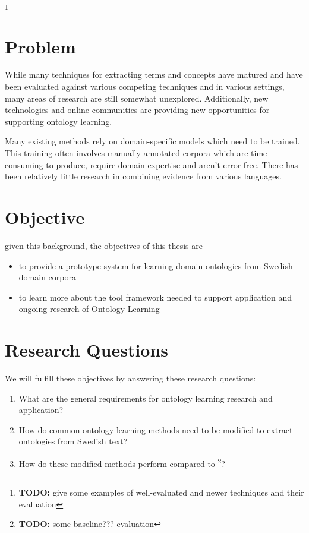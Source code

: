 \documentclass[a4paper]{report}
\newcommand{\todo}[1]{\footnote{{\color{red} {\bf TODO:} #1}}}
\begin{document}
\todo{give some examples of well-evaluated and newer techniques and their evaluation}

\section{Problem}

While many techniques for extracting terms and concepts have matured and have been evaluated against various competing techniques and in various settings, many areas of research are still somewhat unexplored.
Additionally, new technologies and online communities are providing new opportunities for supporting ontology learning.

Many existing methods rely on domain-specific models which need to be trained.
This training often involves manually annotated corpora which are time-consuming to produce, require domain expertise and aren't error-free.
There has been relatively little research in combining evidence from various languages.

\section{Objective}

given this background, the objectives of this thesis are

\begin{itemize}
  \item to provide a prototype system for learning domain ontologies from Swedish domain corpora
  \item to learn more about the tool framework needed to support application and ongoing research of Ontology Learning
\end{itemize}

\section{Research Questions}

We will fulfill these objectives by answering these research questions:

\begin{enumerate}
  \item{What are the general requirements for ontology learning research and application?}
  \item{How do common ontology learning methods need to be modified to extract ontologies from Swedish text?}
  \item{How do these modified methods perform compared to \todo{some baseline??? evaluation}?}
\end{enumerate}
\end{document}
